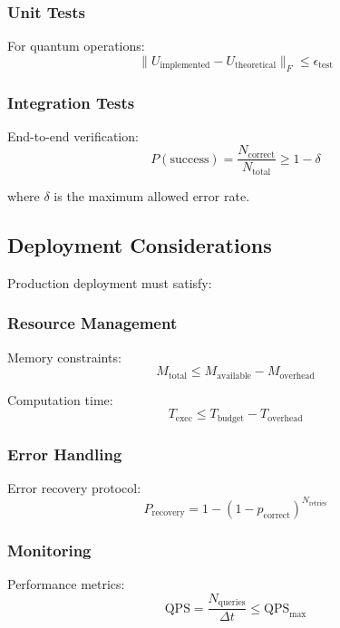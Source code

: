 \documentclass{article}
\begin{document}
\subsubsection{Unit Tests}
For quantum operations:
\begin{equation}
\|U_{\text{implemented}} - U_{\text{theoretical}}\|_F \leq \epsilon_{\text{test}}
\end{equation}

\subsubsection{Integration Tests}
End-to-end verification:
\begin{equation}
P(\text{success}) = \frac{N_{\text{correct}}}{N_{\text{total}}} \geq 1 - \delta
\end{equation}

where $\delta$ is the maximum allowed error rate.

\subsection{Deployment Considerations}
Production deployment must satisfy:

\subsubsection{Resource Management}
Memory constraints:
\begin{equation}
M_{\text{total}} \leq M_{\text{available}} - M_{\text{overhead}}
\end{equation}

Computation time:
\begin{equation}
T_{\text{exec}} \leq T_{\text{budget}} - T_{\text{overhead}}
\end{equation}

\subsubsection{Error Handling}
Error recovery protocol:
\begin{equation}
P_{\text{recovery}} = 1 - (1-p_{\text{correct}})^{N_{\text{retries}}}
\end{equation}

\subsubsection{Monitoring}
Performance metrics:
\begin{equation}
\text{QPS} = \frac{N_{\text{queries}}}{\Delta t} \leq \text{QPS}_{\text{max}}
\end{equation}
\end{document}
